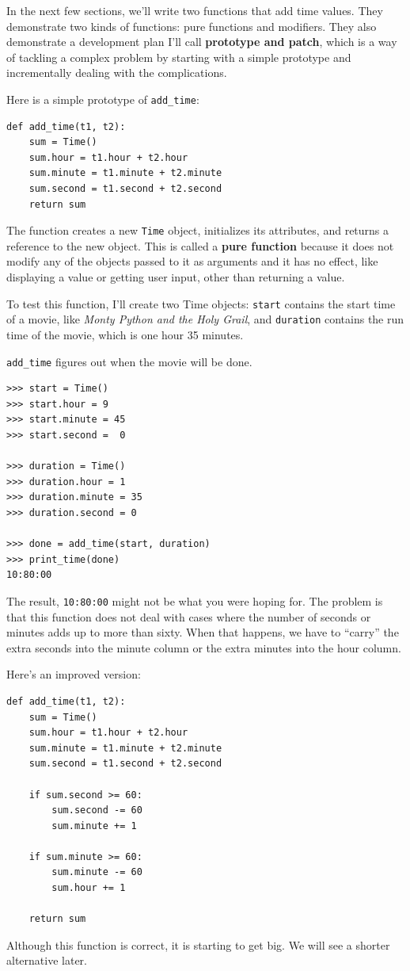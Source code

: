 \documentclass[10pt]{book}
\begin{document}
In the next few sections, we'll write two functions that add time
values.  They demonstrate two kinds of functions: pure functions and
modifiers.  They also demonstrate a development plan I'll call {\bf
  prototype and patch}, which is a way of tackling a complex problem
by starting with a simple prototype and incrementally dealing with the
complications.

Here is a simple prototype of \verb"add_time":

\begin{verbatim}
def add_time(t1, t2):
    sum = Time()
    sum.hour = t1.hour + t2.hour
    sum.minute = t1.minute + t2.minute
    sum.second = t1.second + t2.second
    return sum
\end{verbatim}
%
The function creates a new {\tt Time} object, initializes its
attributes, and returns a reference to the new object.  This is called
a {\bf pure function} because it does not modify any of the objects
passed to it as arguments and it has no effect,
like displaying a value or getting user input, 
other than returning a value.

To test this function, I'll create two Time objects: {\tt start}
contains the start time of a movie, like {\em Monty Python and the
Holy Grail}, and {\tt duration} contains the run time of the movie,
which is one hour 35 minutes.

\verb"add_time" figures out when the movie will be done.

\begin{verbatim}
>>> start = Time()
>>> start.hour = 9
>>> start.minute = 45
>>> start.second =  0

>>> duration = Time()
>>> duration.hour = 1
>>> duration.minute = 35
>>> duration.second = 0

>>> done = add_time(start, duration)
>>> print_time(done)
10:80:00
\end{verbatim}
%
The result, {\tt 10:80:00} might not be what you were hoping
for.  The problem is that this function does not deal with cases where the
number of seconds or minutes adds up to more than sixty.  When that
happens, we have to ``carry'' the extra seconds into the minute column
or the extra minutes into the hour column.

Here's an improved version:

\begin{verbatim}
def add_time(t1, t2):
    sum = Time()
    sum.hour = t1.hour + t2.hour
    sum.minute = t1.minute + t2.minute
    sum.second = t1.second + t2.second

    if sum.second >= 60:
        sum.second -= 60
        sum.minute += 1

    if sum.minute >= 60:
        sum.minute -= 60
        sum.hour += 1

    return sum
\end{verbatim}
%
Although this function is correct, it is starting to get big.
We will see a shorter alternative later.
\end{document}
